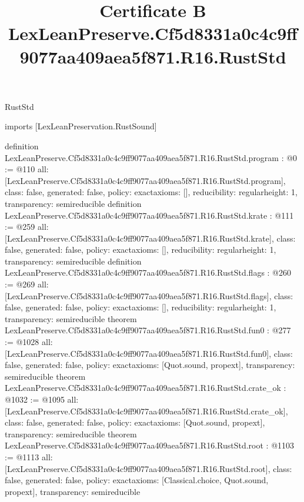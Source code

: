 \begin{lexlean}{RustStd}
\title{Certificate B LexLeanPreserve.Cf5d8331a0c4c9ff9077aa409aea5f871.R16.RustStd}
\begin{coremodule}
imports [LexLeanPreservation.RustSound]

definition LexLeanPreserve.Cf5d8331a0c4c9ff9077aa409aea5f871.R16.RustStd.program : @0 := @110 {
  all: [LexLeanPreserve.Cf5d8331a0c4c9ff9077aa409aea5f871.R16.RustStd.program],
  class: false,
  generated: false,
  policy: exact{axioms: []},
  reducibility: regular{height: 1},
  transparency: semireducible
}
definition LexLeanPreserve.Cf5d8331a0c4c9ff9077aa409aea5f871.R16.RustStd.krate : @111 := @259 {
  all: [LexLeanPreserve.Cf5d8331a0c4c9ff9077aa409aea5f871.R16.RustStd.krate],
  class: false,
  generated: false,
  policy: exact{axioms: []},
  reducibility: regular{height: 1},
  transparency: semireducible
}
definition LexLeanPreserve.Cf5d8331a0c4c9ff9077aa409aea5f871.R16.RustStd.flags : @260 := @269 {
  all: [LexLeanPreserve.Cf5d8331a0c4c9ff9077aa409aea5f871.R16.RustStd.flags],
  class: false,
  generated: false,
  policy: exact{axioms: []},
  reducibility: regular{height: 1},
  transparency: semireducible
}
theorem LexLeanPreserve.Cf5d8331a0c4c9ff9077aa409aea5f871.R16.RustStd.fun0 : @277 := @1028 {
  all: [LexLeanPreserve.Cf5d8331a0c4c9ff9077aa409aea5f871.R16.RustStd.fun0],
  class: false,
  generated: false,
  policy: exact{axioms: [Quot.sound, propext]},
  transparency: semireducible
}
theorem LexLeanPreserve.Cf5d8331a0c4c9ff9077aa409aea5f871.R16.RustStd.crate_ok : @1032 := @1095 {
  all: [LexLeanPreserve.Cf5d8331a0c4c9ff9077aa409aea5f871.R16.RustStd.crate_ok],
  class: false,
  generated: false,
  policy: exact{axioms: [Quot.sound, propext]},
  transparency: semireducible
}
theorem LexLeanPreserve.Cf5d8331a0c4c9ff9077aa409aea5f871.R16.RustStd.root : @1103 := @1113 {
  all: [LexLeanPreserve.Cf5d8331a0c4c9ff9077aa409aea5f871.R16.RustStd.root],
  class: false,
  generated: false,
  policy: exact{axioms: [Classical.choice, Quot.sound, propext]},
  transparency: semireducible
}


\end{coremodule}
\end{lexlean}

